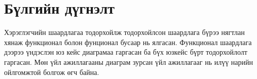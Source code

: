 \newpage
\section{Бүлгийн дүгнэлт}
Хэрэглэгчийн шаардлагаа тодорхойлж тодорхойлсон шаардлага бүрээ нягтлан хянаж функционал болон фунционал бусаар нь ялгасан. Функционал шаардлага дээрээ үндэслэн юз кейс диаграмаа гаргасан ба бүх  юзкейс бүрт тодорхойлолт гаргасан. Мөн үйл ажиллагааны диаграм зурсан үйл ажиллагааг нь илүү нарийн ойлгомжтой болгож өгч байна.

